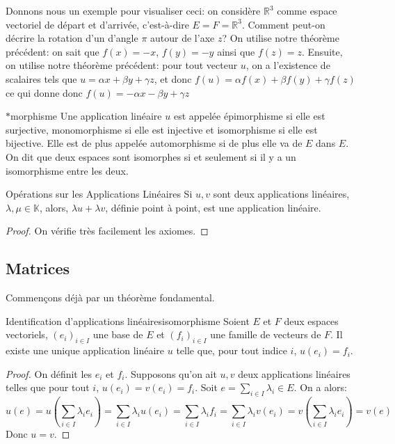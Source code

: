 \documentclass{classe}
\renewcommand*{\K}{\mathbb{K}}
\begin{document}
\begin{example}
Donnons nous un exemple pour visualiser ceci: on considère $\mathbb{R}^3$ comme espace vectoriel de départ et d'arrivée, c'est-à-dire $E = F = \mathbb{R}^3$.
Comment peut-on décrire la rotation d'un d'angle $\pi$ autour de l'axe $z$?
On utilise notre théorème précédent: on sait que $f(x) = -x$, $f(y) = -y$ ainsi que $f(z) = z$.
Ensuite, on utilise notre théorème précédent: pour tout vecteur $u$, on a l'existence de scalaires tels que $u = \alpha x + \beta y + \gamma z$, et donc $f(u) = \alpha f(x) + \beta f(y) + \gamma f(z)$ ce qui donne donc $f(u) = -\alpha x - \beta y + \gamma z$
\end{example}

\begin{définition}{$*$morphisme}{}
	Une application linéaire $u$ est appelée épimorphisme si elle est surjective, monomorphisme si elle est injective et isomorphisme si elle est bijective.
	Elle est de plus appelée automorphisme si de plus elle va de $E$ dans $E$.
	On dit que deux espaces sont isomorphes si et seulement si il y a un isomorphisme entre les deux.
\end{définition}

\begin{propositionfr}{Opérations sur les Applications Linéaires}{}
	Si $u, v$ sont deux applications linéaires, $\lambda, \mu \in \K$, alors, $\lambda u + \lambda v$, définie point à point, est une application linéaire.
\end{propositionfr}
\begin{proof}
	On vérifie très facilement les axiomes.
\end{proof}

\subsection{Matrices}
Commençons déjà par un théorème fondamental.

\begin{théorème}{Identification d'applications linéaires}{isomorphisme}
	Soient $E$ et $F$ deux espaces vectoriels, $(e_i)_{i\in I}$ une base de $E$ et $(f_i)_{i\in I}$ une famille de vecteurs de $F$. Il existe une unique application linéaire $u$ telle que, pour tout indice $i$, $u(e_{i}) = f_{i}$.
\end{théorème}
\begin{proof}
	On définit les $e_{i}$ et $f_{i}$.
	Supposons qu'on ait $u, v$ deux applications linéaires telles que pour tout $i$, $u\left( e_{i} \right) = v\left( e_{i} \right) = f_{i}$.
	Soit $e = \sum_{i \in I} \lambda_{i} \in E$. On a alors:
	\begin{equation*}
		u(e) = u\left(\sum_{i \in I}\lambda_{i}e_{i}\right) = \sum_{i \in I}\lambda_{i}u\left( e_{i} \right) = \sum_{i \in I}\lambda_{i}f_{i} = \sum_{i \in I} \lambda_{i}v\left( e_{i} \right) = v\left( \sum_{i \in I}\lambda_{i}e_{i} \right) = v\left( e \right)
	\end{equation*}
	Donc $u = v$.
\end{proof}
\end{document}
